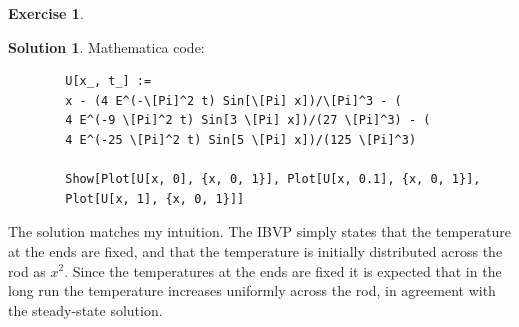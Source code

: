 \documentclass{article}
\theoremstyle{definition}
\newtheorem*{exer*}{Exercise}
\newtheorem*{sln*}{Solution}
\begin{document}
\begin{exer*}
\begin{sln*}
		\noindent Mathematica code:
		\begin{lstlisting}
		U[x_, t_] := 
		x - (4 E^(-\[Pi]^2 t) Sin[\[Pi] x])/\[Pi]^3 - (
		4 E^(-9 \[Pi]^2 t) Sin[3 \[Pi] x])/(27 \[Pi]^3) - (
		4 E^(-25 \[Pi]^2 t) Sin[5 \[Pi] x])/(125 \[Pi]^3)
		
		Show[Plot[U[x, 0], {x, 0, 1}], Plot[U[x, 0.1], {x, 0, 1}], 
		Plot[U[x, 1], {x, 0, 1}]]
		\end{lstlisting}
		
		The solution matches my intuition. The IBVP simply states that the temperature at the ends are fixed, and that the temperature is initially distributed across the rod as $x^2$. Since the temperatures at the ends are fixed it is expected that in the long run the temperature increases uniformly across the rod, in agreement with the steady-state solution. 
		
	\end{sln*}
\end{exer*}
\newpage
\end{document}
